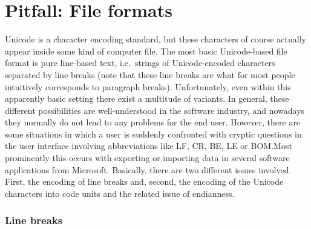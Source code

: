 

\section{Pitfall: File formats}
\label{pitfall-file-formats}

Unicode is a character encoding standard, but these characters of course
actually appear inside some kind of computer file. The most basic Unicode-based file
format is pure line-based text, i.e.~strings of Unicode-encoded characters
separated by line breaks (note that these line breaks are what for most people
intuitively corresponds to paragraph breaks). Unfortunately, even within this
apparently basic setting there exist a multitude of variants. In general, these
different possibilities are well-understood in the software industry, and
nowadays they normally do not lead to any problems for the end user. However,
there are some situations in which a user is suddenly confronted with cryptic
questions in the user interface involving abbreviations like LF, CR, BE, LE or
BOM.\@ Most prominently this occurs with exporting or importing data in several
software applications from Microsoft. Basically, there are two different issues
involved. First, the encoding of line breaks and, second, the encoding of the
Unicode characters into code units and the related issue of endianness.

\subsubsection*{Line breaks}

